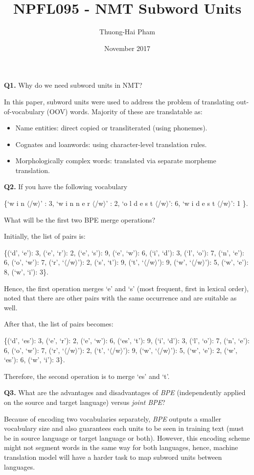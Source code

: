 \documentclass{article}
\title{NPFL095 - NMT Subword Units}
\author{Thuong-Hai Pham}
\date{November 2017}
\def\<#1>{$\langle$\ignorespaces#1\unskip$\rangle$}
\begin{document}
\maketitle

\textbf{Q1.} Why do we need subword units in NMT?

In this paper, subword units were used to address the problem of translating out-of-vocabulary (OOV) words. Majority of these are translatable as:
\begin{itemize}
    \item Name entities: direct copied or transliterated (using phonemes).
    \item Cognates and loanwords: using character-level translation rules.
    \item Morphologically complex words: translated via separate morpheme translation.
\end{itemize}

\bigskip

\textbf{Q2.} If you have the following vocabulary

\{`w i n \</w>' : 3, `w i n n e r \</w>' : 2, `o l d e s t \</w>': 6, `w i d e s t \</w>': 1 \}. 

What will be the first two BPE merge operations?

Initially, the list of pairs is:

\{(`d', `e'): 3, (`e', `r'): 2, (`e', `s'): 9, (`e', `w'): 6, (`i', `d'): 3, (`l', `o'): 7, (`n', `e'): 6, (`o', `w'): 7, (`r', `\</w>'): 2, (`s', `t'): 9, (`t', `\</w>'): 9, (`w', `\</w>'): 5, (`w', `e'): 8, (`w', `i'): 3\}.

Hence, the first operation merges `e' and `s' (most frequent, first in lexical order), noted that there are other pairs with the same occurrence and are suitable as well.

After that, the list of pairs becomes:

\{(`d', `es'): 3, (`e', `r'): 2, (`e', `w'): 6, (`es', `t'): 9, (`i', `d'): 3, (`l', `o'): 7, (`n', `e'): 6, (`o', `w'): 7, (`r', `\</w>'): 2, (`t', `\</w>'): 9, (`w', `\</w>'): 5, (`w', `e'): 2, (`w', `es'): 6, (`w', `i'): 3\}.

Therefore, the second operation is to merge `es' and `t'.

\bigskip

\textbf{Q3.} What are the advantages and disadvantages of \textit{BPE} (independently applied on the source and target language) versus \textit{joint BPE}?

Because of encoding two vocabularies separately, \textit{BPE} outputs a smaller vocabulary size and also guarantees each units to be seen in training text (must be in source language or target language or both). However, this encoding scheme might not segment words in the same way for both languages, hence, machine translation model will have a harder task to map subword units between languages.
\end{document}
